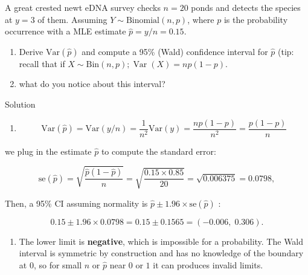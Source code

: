 \documentclass[
  letterpaper,
  DIV=11,
  numbers=noendperiod,
  oneside]{scrartcl}
\providecommand{\tightlist}{%
  \setlength{\itemsep}{0pt}\setlength{\parskip}{0pt}}\usepackage{longtable,booktabs,array}
\begin{document}
\begin{tcolorbox}[enhanced jigsaw, bottomrule=.15mm, breakable, bottomtitle=1mm, colback=white, titlerule=0mm, colbacktitle=quarto-callout-tip-color!10!white, rightrule=.15mm, toptitle=1mm, left=2mm, opacityback=0, toprule=.15mm, arc=.35mm, title={Task 2}, colframe=quarto-callout-tip-color-frame, coltitle=black, leftrule=.75mm, opacitybacktitle=0.6]

A great crested newt eDNA survey checks \(n = 20\) ponds and detects the
species at \(y = 3\) of them. Assuming \(Y \sim \text{Binomial}(n, p)\),
where \(p\) is the probability occurrence with a MLE estimate
\(\hat p = y/n = 0.15\).

\begin{enumerate}
\def\labelenumi{(\alph{enumi})}
\tightlist
\item
  Derive \(\text{Var}(\hat p)\) and compute a 95\% (Wald) confidence
  interval for \(\hat p\) (tip: recall that if
  \(X\sim\text{Bin}(n,p); \operatorname{Var}(X)=np(1-p)\).
\item
  what do you notice about this interval?
\end{enumerate}

Solution

\begin{enumerate}
\def\labelenumi{(\alph{enumi})}
\tightlist
\item
  \[
  \text{Var}(\hat p) = \text{Var}(y/n) = \frac{1}{n^2}\text{Var}(y) = \frac{np(1-p)}{n^2} = \frac{p(1-p)}{n}
  \]
\end{enumerate}

we plug in the estimate \(\hat p\) to compute the standard error:

\[
\text{se}(\hat p) = \sqrt{\frac{\hat p(1-\hat p)}{n}}
= \sqrt{\frac{0.15 \times 0.85}{20}} = \sqrt{0.006375} = 0.0798,
\]

Then, a 95\% CI assuming normality is
\(\hat p\pm 1.96 \times \text{se}(\hat p)\) :

\[
0.15 \pm 1.96 \times 0.0798 = 0.15 \pm 0.1565 = (-0.006,\; 0.306).
\]

\begin{enumerate}
\def\labelenumi{(\alph{enumi})}
\setcounter{enumi}{1}
\tightlist
\item
  The lower limit is \textbf{negative}, which is impossible for a
  probability. The Wald interval is symmetric by construction and has no
  knowledge of the boundary at \(0\), so for small \(n\) or \(\hat p\)
  near \(0\) or \(1\) it can produces invalid limits.
\end{enumerate}

\end{tcolorbox}
\end{document}
